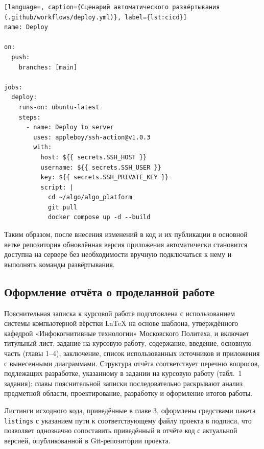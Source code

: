 \begin{lstlisting}[language=, caption={Сценарий автоматического развёртывания (.github/workflows/deploy.yml)}, label={lst:cicd}]
name: Deploy

on:
  push:
    branches: [main]

jobs:
  deploy:
    runs-on: ubuntu-latest
    steps:
      - name: Deploy to server
        uses: appleboy/ssh-action@v1.0.3
        with:
          host: ${{ secrets.SSH_HOST }}
          username: ${{ secrets.SSH_USER }}
          key: ${{ secrets.SSH_PRIVATE_KEY }}
          script: |
            cd ~/algo/algo_platform
            git pull
            docker compose up -d --build
\end{lstlisting}

Таким образом, после внесения изменений в код и их публикации в
основной ветке репозитория обновлённая версия приложения автоматически
становится доступна на сервере без необходимости вручную подключаться
к нему и выполнять команды развёртывания.

\subsection{Оформление отчёта о проделанной работе}

Пояснительная записка к курсовой работе подготовлена с использованием
системы компьютерной вёрстки LaTeX на основе шаблона, утверждённого
кафедрой «Инфокогнитивные технологии» Московского Политеха, и включает
титульный лист, задание на курсовую работу, содержание, введение,
основную часть (главы 1--4), заключение, список использованных
источников и приложения с вынесенными диаграммами. Структура отчёта
соответствует перечню вопросов, подлежащих разработке, указанному в
задании на курсовую работу (табл.~1 задания): главы пояснительной
записки последовательно раскрывают анализ предметной области,
проектирование, разработку и оформление итогов работы.

Листинги исходного кода, приведённые в главе 3, оформлены средствами
пакета \texttt{listings} с указанием пути к соответствующему файлу
проекта в подписи, что позволяет однозначно сопоставить приведённый в
отчёте код с актуальной версией, опубликованной в Git-репозитории
проекта.
